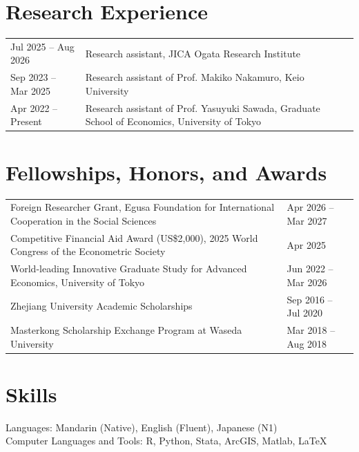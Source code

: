 \documentclass[10pt,a4paper]{article}
\begin{document}
\section*{Research Experience}
\begin{tabularx}{\textwidth}{@{}p{}X@{}}
Jul 2025 -- Aug 2026 & Research assistant, JICA Ogata Research Institute \\
Sep 2023 -- Mar 2025 & Research assistant of Prof. Makiko Nakamuro, Keio University \\
Apr 2022 -- Present & Research assistant of Prof. Yasuyuki Sawada, Graduate School of Economics, University of Tokyo \\
\end{tabularx}

\newpage
\section*{Fellowships, Honors, and Awards}
\begin{tabularx}{\textwidth}{@{}>{\raggedright\arraybackslash}X@{\hspace{1em}}>{\raggedleft\arraybackslash}p{}@{}}
Foreign Researcher Grant, Egusa Foundation for International Cooperation in the Social Sciences & Apr 2026 -- Mar 2027 \\
Competitive Financial Aid Award (US\$2,000), 2025 World Congress of the Econometric Society & Apr 2025 \\
World-leading Innovative Graduate Study for Advanced Economics, University of Tokyo & Jun 2022 -- Mar 2026 \\
Zhejiang University Academic Scholarships & Sep 2016 -- Jul 2020 \\
Masterkong Scholarship Exchange Program at Waseda University & Mar 2018 -- Aug 2018 \\
\end{tabularx}

\section*{Skills}
Languages: Mandarin (Native), English (Fluent), Japanese (N1) \\
Computer Languages and Tools: R, Python, Stata, ArcGIS, Matlab, LaTeX
\end{document}
